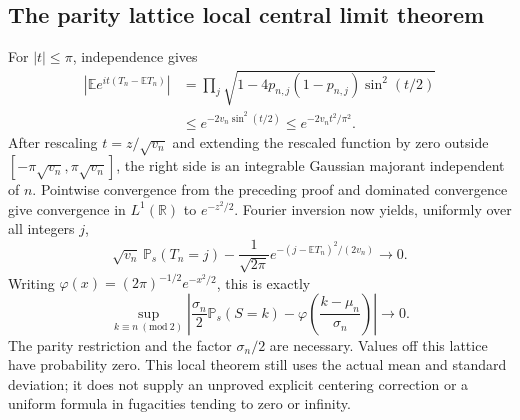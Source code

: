 \documentclass[11pt,letterpaper]{article}
\theoremstyle{remark}\newtheorem{remark}[theorem]{Remark}
\newcommand{\R}{\mathbb R}\newcommand{\C}{\mathbb C}\newcommand{\N}{\mathbb N}
\begin{document}
\subsection{The parity lattice local central limit theorem}
For $|t|\le\pi$, independence gives
\begin{equation}\label{dsasm:pr:charbound}
\begin{split}
 |\mathbb E e^{it(T_n-\mathbb ET_n)}|
 &=\prod_j\sqrt{1-4p_{n,j}(1-p_{n,j})\sin^2(t/2)}\\
 &\le e^{-2v_n\sin^2(t/2)}\le e^{-2v_nt^2/\pi^2}.
\end{split}
\end{equation}
After rescaling $t=z/\sqrt{v_n}$ and extending the rescaled function
by zero outside $[-\pi\sqrt{v_n},\pi\sqrt{v_n}]$, the right side is
an integrable Gaussian majorant independent of $n$. Pointwise
convergence from the preceding proof and dominated convergence give
convergence in $L^1(\R)$ to $e^{-z^2/2}$. Fourier inversion now yields,
uniformly over all integers $j$,
\[
 \sqrt{v_n}\,\mathbb P_s(T_n=j)
 -\frac1{\sqrt{2\pi}}
       e^{-(j-\mathbb ET_n)^2/(2v_n)}\longrightarrow0.
\]
Writing $\varphi(x)=(2\pi)^{-1/2}e^{-x^2/2}$, this is exactly
\begin{equation}\label{dsasm:pr:lclt}
 \sup_{k\equiv n\ (\mathrm{mod}\ 2)}
 \left|\frac{\sigma_n}{2}\mathbb P_s(S=k)
       -\varphi\left(\frac{k-\mu_n}{\sigma_n}\right)\right|
 \longrightarrow0.
\end{equation}
The parity restriction and the factor $\sigma_n/2$ are necessary.
Values off this lattice have probability zero. This local theorem
still uses the actual mean and standard deviation; it does not supply
an unproved explicit centering correction or a uniform formula in
fugacities tending to zero or infinity.
\end{document}
